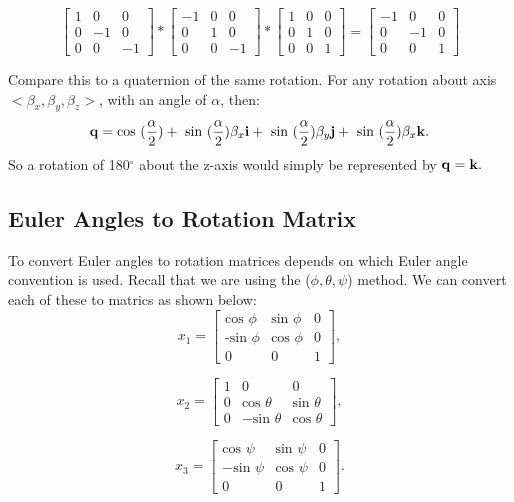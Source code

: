 $$
\begin{bmatrix}
1	&	0 	& 	0 \\
0 	& 	-1	&	0 \\
0 	& 	0 	& 	-1
\end{bmatrix}
*
\begin{bmatrix}
-1	&	0 	& 	0 \\
0 	& 	1	&	0 \\
0 	& 	0 	& 	-1
\end{bmatrix}
*
\begin{bmatrix}
1	&	0 	& 	0 \\
0 	& 	1	&	0 \\
0 	& 	0 	& 	1
\end{bmatrix}
=
\begin{bmatrix}
-1	&	0 	& 	0 \\
0 	& 	-1	&	0 \\
0 	& 	0 	& 	1
\end{bmatrix} $$

Compare this to a quaternion of the same rotation.
For any rotation about axis $<\beta_x, \beta_y, \beta_z>$, with an angle of $\alpha$, then: $$ \text{\textbf{q}} = \text{cos }(\frac{\alpha}{2}) + \text{ sin }(\frac{\alpha}{2})\beta_x\text{\textbf{i}} + \text{ sin }(\frac{\alpha}{2})\beta_y\text{\textbf{j}} + \text{ sin }(\frac{\alpha}{2}) \beta_x\text{\textbf{k}}. $$
So a rotation of 180$^\circ$ about the z-axis would simply be represented by $\text{\textbf{q}} = \text{\textbf{k}}.$

\subsection{Euler Angles to Rotation Matrix}
To convert Euler angles to rotation matrices depends on which Euler angle convention is used.
Recall that we are using the ($\phi, \theta, \psi$) method.
We can convert each of these to matrics as shown below:
$$
x_1 =
\begin{bmatrix}
\text{cos }\phi & \text{sin } \phi & 0 \\
\text{-sin }\phi & \text{cos }\phi & 0 \\
0 & 0 & 1
\end{bmatrix},
$$

$$
x_2 =
\begin{bmatrix}
1 & 0 & 0 \\
0 & \text{cos } \theta & \text{sin } \theta \\
0 & -\text{sin } \theta & \text{cos } \theta
\end{bmatrix},
$$

$$
x_3 =
\begin{bmatrix}
\text{cos } \psi & \text{sin } \psi & 0 \\
- \text{sin } \psi & \text{cos } \psi & 0 \\
0 & 0 & 1
\end{bmatrix}.
$$

